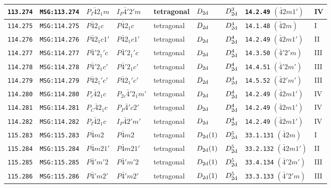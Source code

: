\documentclass[fleqn,10pt]{jsarticle}
\begin{document}
\begin{center}
\begin{longtable}{lllllllll}
\texttt{113.274} & \texttt{MSG:113.274} & $P_{I}\bar{4}2_{1}m$ & $I_{P}\bar{4}'2'm$ & tetragonal & $D_{\rm 2d}$ & $D_{\rm 2d}^{3}$ & \texttt{14.2.49} $(\bar{4}2m1')$ & IV \\ \hline
\texttt{114.275} & \texttt{MSG:114.275} & $P\bar{4}2_{1}c$ & $P\bar{4}2_{1}c$ & tetragonal & $D_{\rm 2d}$ & $D_{\rm 2d}^{4}$ & \texttt{14.1.48} $(\bar{4}2m)$ & I \\
\texttt{114.276} & \texttt{MSG:114.276} & $P\bar{4}2_{1}c1'$ & $P\bar{4}2_{1}c1'$ & tetragonal & $D_{\rm 2d}$ & $D_{\rm 2d}^{4}$ & \texttt{14.2.49} $(\bar{4}2m1')$ & II \\
\texttt{114.277} & \texttt{MSG:114.277} & $P\bar{4}'2_{1}'c$ & $P\bar{4}'2_{1}'c$ & tetragonal & $D_{\rm 2d}$ & $D_{\rm 2d}^{4}$ & \texttt{14.3.50} $(\bar{4}'2'm)$ & III \\
\texttt{114.278} & \texttt{MSG:114.278} & $P\bar{4}'2_{1}c'$ & $P\bar{4}'2_{1}c'$ & tetragonal & $D_{\rm 2d}$ & $D_{\rm 2d}^{4}$ & \texttt{14.4.51} $(\bar{4}'2m')$ & III \\
\texttt{114.279} & \texttt{MSG:114.279} & $P\bar{4}2_{1}'c'$ & $P\bar{4}2_{1}'c'$ & tetragonal & $D_{\rm 2d}$ & $D_{\rm 2d}^{4}$ & \texttt{14.5.52} $(\bar{4}2'm')$ & III \\
\texttt{114.280} & \texttt{MSG:114.280} & $P_{c}\bar{4}2_{1}c$ & $P_{2c}\bar{4}'2_{1}m'$ & tetragonal & $D_{\rm 2d}$ & $D_{\rm 2d}^{4}$ & \texttt{14.2.49} $(\bar{4}2m1')$ & IV \\
\texttt{114.281} & \texttt{MSG:114.281} & $P_{C}\bar{4}2_{1}c$ & $P_{P}\bar{4}'c2'$ & tetragonal & $D_{\rm 2d}$ & $D_{\rm 2d}^{4}$ & \texttt{14.2.49} $(\bar{4}2m1')$ & IV \\
\texttt{114.282} & \texttt{MSG:114.282} & $P_{I}\bar{4}2_{1}c$ & $I_{P}\bar{4}2'm'$ & tetragonal & $D_{\rm 2d}$ & $D_{\rm 2d}^{4}$ & \texttt{14.2.49} $(\bar{4}2m1')$ & IV \\ \hline
\texttt{115.283} & \texttt{MSG:115.283} & $P\bar{4}m2$ & $P\bar{4}m2$ & tetragonal & $D_{\rm 2d}(1)$ & $D_{\rm 2d}^{5}$ & \texttt{33.1.131} $(\bar{4}2m)$ & I \\
\texttt{115.284} & \texttt{MSG:115.284} & $P\bar{4}m21'$ & $P\bar{4}m21'$ & tetragonal & $D_{\rm 2d}(1)$ & $D_{\rm 2d}^{5}$ & \texttt{33.2.132} $(\bar{4}2m1')$ & II \\
\texttt{115.285} & \texttt{MSG:115.285} & $P\bar{4}'m'2$ & $P\bar{4}'m'2$ & tetragonal & $D_{\rm 2d}(1)$ & $D_{\rm 2d}^{5}$ & \texttt{33.4.134} $(\bar{4}'2m')$ & III \\
\texttt{115.286} & \texttt{MSG:115.286} & $P\bar{4}'m2'$ & $P\bar{4}'m2'$ & tetragonal & $D_{\rm 2d}(1)$ & $D_{\rm 2d}^{5}$ & \texttt{33.3.133} $(\bar{4}'2'm)$ & III \\

\end{longtable}
\end{center}
\end{document}
